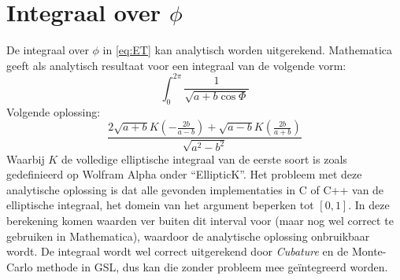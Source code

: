 \documentclass[a4paper,11pt]{article}
\numberwithin{equation}{section} %
\begin{document}
\section{Integraal over $\phi$} \label{app:PhiIntegral}
De integraal over $\phi$ in \eqref{eq:ET} kan analytisch worden uitgerekend.
Mathematica geeft als analytisch resultaat voor een integraal van de volgende vorm:
\begin{equation}
\int_0^{2\pi} \frac{1}{\sqrt{a + b \cos{\Phi}}}
\end{equation}
Volgende oplossing:
\begin{equation}
\frac{2 \sqrt{a + b} K(-\frac{2b}{a - b}) + \sqrt{a - b} K(\frac{2b}{a + b})}{\sqrt{a^2 - b^2}}
\end{equation}
Waarbij $K$ de volledige elliptische integraal van de eerste soort is zoals gedefinieerd op Wolfram Alpha onder “EllipticK”.
Het probleem met deze analytische oplossing is dat alle gevonden implementaties in C of C++ van de elliptische integraal, het domein van het argument beperken tot $[0,1]$.
In deze berekening komen waarden ver buiten dit interval voor (maar nog wel correct te gebruiken in Mathematica), waardoor de analytische oplossing onbruikbaar wordt.
De integraal wordt wel correct uitgerekend door \textit{Cubature} en de Monte-Carlo methode in GSL, dus kan die zonder probleem mee geïntegreerd worden.
\end{document}
